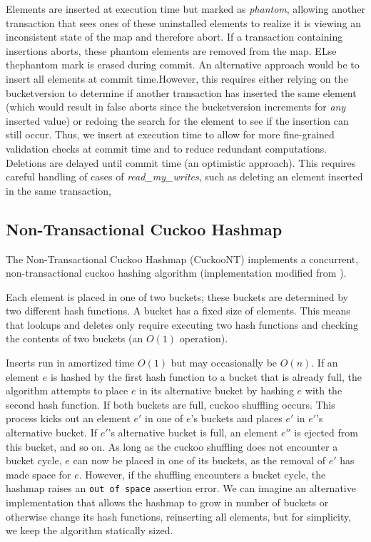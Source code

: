 Elements are inserted at execution time but marked as \emph{phantom}, allowing another transaction that sees ones of these uninstalled elements to realize it is viewing an inconsistent state of the map and therefore abort. If a transaction containing insertions aborts, these phantom elements are removed from the map. ELse thephantom mark is erased during commit. An alternative approach would be to insert all elements at commit time.However, this requires either relying on the bucketversion to determine if another transaction has inserted the same element (which would result in false aborts since the bucketversion increments for \emph{any} inserted value) or redoing the search for the element to see if the insertion can still occur. Thus, we insert at execution time to allow for more fine-grained validation checks at commit time and to reduce redundant computations. Deletions are delayed until commit time (an optimistic approach). This requires careful handling of cases of \emph{read\_my\_writes}, such as deleting an element inserted in the same transaction, 

\subsection{Non-Transactional Cuckoo Hashmap}
The Non-Transactional Cuckoo Hashmap (CuckooNT) implements a concurrent, non-transactional cuckoo hashing algorithm (implementation modified from \cite{cuckoocode}).

Each element is placed in one of two buckets; these buckets are determined by two different hash functions. A bucket has a fixed size of elements. This means that lookups and deletes only require executing two hash functions and checking the contents of two buckets (an $O(1)$ operation).

Inserts run in amortized time $O(1)$ but may occasionally be $O(n)$.
If an element $e$ is hashed by the first hash function to a bucket that is already full, the algorithm attempts to place $e$ in its alternative bucket by hashing $e$ with the second hash function. If both buckets are full, cuckoo shuffling occurs. This process kicks out an element $e'$ in one of $e$'s buckets and places $e'$ in $e'$'s alternative bucket. If $e'$'s alternative bucket is full, an element $e''$ is ejected from this bucket, and so on. As long as the cuckoo shuffling does not encounter a bucket cycle, $e$ can now be placed in one of its buckets, as the removal of $e'$ has made space for $e$.
However, if the shuffling encounters a bucket cycle, the hashmap raises an \texttt{out of space} assertion error. We can imagine an alternative implementation that allows the hashmap to grow in number of buckets or otherwise change its hash functions, reinserting all elements, but for simplicity, we keep the algorithm statically sized.

